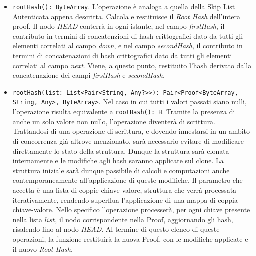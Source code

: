 		\begin{itemize}
			
			\item \verb!rootHash(): ByteArray!. L'operazione è analoga a quella della Skip List Autenticata appena descritta. Calcola e restituisce il \textit{Root Hash} dell'intera proof. Il nodo \textit{HEAD} conterrà in ogni istante, nel campo \textit{firstHash}, il contributo in termini di concatenzioni di hash crittografici dato da tutti gli elementi correlati al campo \textit{down}, e nel campo \textit{secondHash}, il contributo in termini di concatenazioni di hash crittografici dato da tutti gli elementi correlati al campo \textit{next}. Viene, a questo punto, restituito l'hash derivato dalla concatenazione dei campi \textit{firstHash} e \textit{secondHash}.
			
			\item \verb!rootHash(list: List<Pair<String, Any?>>): Pair<Proof<ByteArray, String, Any>, ByteArray>!. Nel caso in cui tutti i valori passati siano nulli, l'operazione risulta equivalente a \verb|rootHash(): H|. Tramite la presenza di anche un solo valore non nullo, l'operazione diventerà di scrittura. Trattandosi di una operazione di scrittura, e dovendo innestarsi in un ambito di concorrenza già altrove menzionato, sarà necessario evitare di modificare direttamente lo stato della struttura. Dunque la struttura sarà clonata internamente e le modifiche agli hash saranno applicate sul clone. La struttura iniziale sarà dunque passibile di calcoli e computazioni anche contemporaneamente all'applicazione di queste modifiche. Il parametro che accetta è una lista di coppie chiave-valore, struttura che verrà processata iterativamente, rendendo superflua l'applicazione di una mappa di coppia chiave-valore. Nello specifico l'operazione processerà, per ogni chiave presente nella lista $ list $, il nodo corrispondente nella Proof, aggiornando gli hash, risalendo fino al nodo \textit{HEAD}. Al termine di questo elenco di queste operazioni, la funzione restituirà la nuova Proof, con le modifiche applicate e il nuovo \textit{Root Hash}.
			

\end{itemize}
